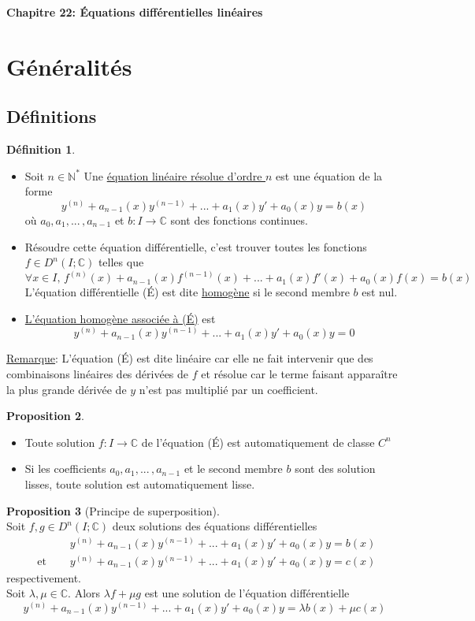 \documentclass[10pt,a4paper]{article}
\theoremstyle{definition}
\newtheorem{proposition}{Proposition}[section]
\newtheorem{definition}[proposition]{Définition}
\begin{document}
\renewcommand{\labelitemi}{$*$}
\begin{center}
{\Large \textbf{Chapitre 22: Équations différentielles linéaires}}
\end{center}

\section{Généralités}
\subsection{Définitions}
\begin{definition}
\hfill \begin{itemize}
\item Soit $n \in \mathbb{N}^*$
Une \uline{équation linéaire résolue d'ordre $n$} est une équation de la forme
\[ y^{(n)} + a_{n - 1}(x)y^{(n - 1)} + ... + a_1(x)y' + a_0(x)y = b(x) \tag{É} \]
où $a_0, a_1, ...\,, a_{n - 1}$ et $b: I \to \mathbb{C}$ sont des fonctions continues.
\item Résoudre cette équation différentielle, c'est trouver toutes les fonctions $f \in D^n(I; \mathbb{C})$ telles que
\[ \forall x \in I,\, f^{(n)}(x) + a_{n - 1}(x)f^{(n - 1)}(x) + ... + a_1(x)f'(x) + a_0(x)f(x) = b(x) \]
L'équation différentielle (É) est dite \uline{homogène} si le second membre $b$ est nul.
\item \uline{L'équation homogène associée à (É)} est
\[ y^{(n)} + a_{n - 1}(x)y^{(n - 1)} + ... + a_1(x)y' + a_0(x)y = 0 \tag{ÉH} \]
\end{itemize}
\end{definition}
\noindent \uline{Remarque}: L'équation (É) est dite linéaire car elle ne fait intervenir que des combinaisons linéaires des dérivées de $f$ et résolue car le terme faisant apparaître la plus grande dérivée de $y$ n'est pas multiplié par un coefficient.
\begin{proposition}
\hfill
\begin{itemize}
\item Toute solution $f: I \to \mathbb{C}$ de l'équation (É) est automatiquement de classe $C^n$
\item Si les coefficients $a_0, a_1, ...\,, a_{n - 1}$ et le second membre $b$ sont des solution lisses, toute solution est automatiquement lisse.
\end{itemize}
\end{proposition}
\begin{proposition}[Principe de superposition]
\hfill \\
Soit $f, g \in D^n(I; \mathbb{C})$ deux solutions des équations différentielles
\begin{align*}
&y^{(n)} + a_{n - 1}(x)y^{(n - 1)} + ... + a_1(x)y' + a_0(x)y = b(x) \\
\text{ et } \quad &y^{(n)} + a_{n - 1}(x)y^{(n - 1)} + ... + a_1(x)y' + a_0(x)y = c(x)
\end{align*}
respectivement. \\
Soit $\lambda, \mu \in \mathbb{C}$. Alors $\lambda f + \mu g$ est une solution de l'équation différentielle
\[ y^{(n)} + a_{n - 1}(x)y^{(n - 1)} + ... + a_1(x)y' + a_0(x)y = \lambda b(x) + \mu c(x) \]
\end{proposition}
\end{document}
